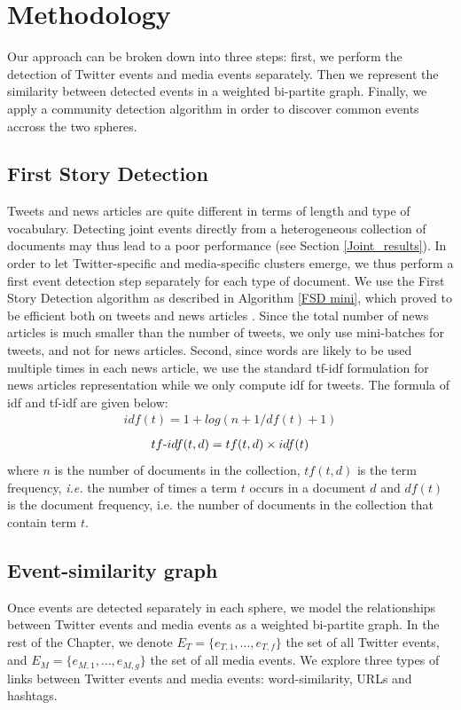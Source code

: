 \section{Methodology}
\label{JointEventsMethodo}
Our approach can be broken down into three steps: first, we perform the detection of Twitter events and media events separately. Then we represent the similarity between detected events in a weighted bi-partite graph. Finally, we apply a community detection algorithm in order to discover common events accross the two spheres.

\subsection{First Story Detection}
Tweets and news articles are quite different in terms of length and type of vocabulary. Detecting joint events directly from a heterogeneous collection of documents may thus lead to a poor performance (see Section \ref{Joint_results}). In order to let Twitter-specific and media-specific clusters emerge, we thus perform a first event detection step separately for each type of document. We use the First Story Detection algorithm as described in Algorithm \ref{FSD mini}, which proved to be efficient both on tweets \citep{mazoyer2020french} and news articles \citep{cage2020production}. Since the total number of news articles is much smaller than the number of tweets, we only use mini-batches for tweets, and not for news articles. Second, since words are likely to be used multiple times in each news article, we use the standard tf-idf formulation for news articles representation while we only compute idf for tweets. The formula of idf and tf-idf are given below:
\begin{align}
idf(t) = 1 + log(n+1/df(t)+1)
\end{align}
\begin{align}
tf{\text -}idf(t, d) = tf(t, d) \times idf(t)
\end{align}
where $n$ is the number of documents in the collection, $tf(t, d)$ is the term frequency, \textit{i.e.} the number of times a term $t$ occurs in a document $d$ and $df(t)$ is the document frequency, i.e. the number of documents in the collection that contain term $t$.

\subsection{Event-similarity graph}
Once events are detected separately in each sphere, we model the relationships between Twitter events and media events as a weighted bi-partite graph. In the rest of the Chapter, we denote $E_T = \{e_{T,1},\ldots,e_{T,f}\}$ the set of all Twitter events, and $E_M = \{e_{M,1},\ldots,e_{M,g}\}$ the set of all media events. We explore three types of links between Twitter events and media events: word-similarity, URLs and hashtags. 
